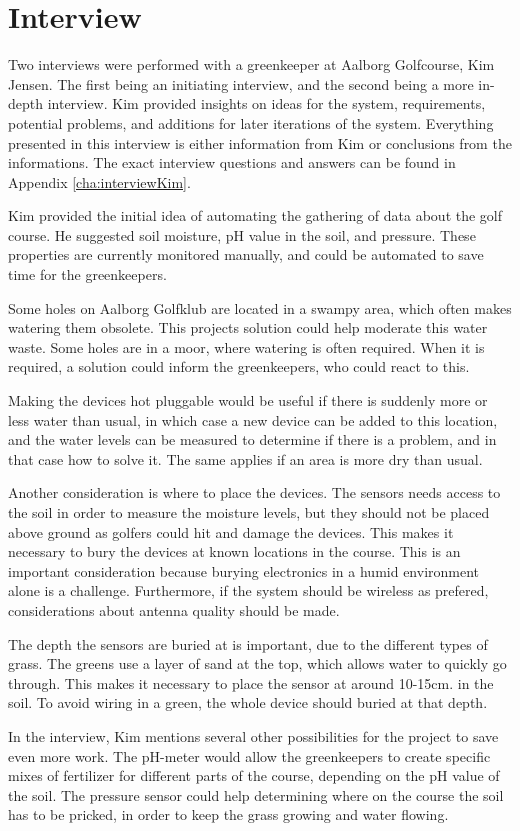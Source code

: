 \section{Interview}
Two interviews were performed with a greenkeeper at Aalborg Golfcourse, Kim Jensen. The first being an initiating interview, and the second being a more in-depth interview. Kim provided insights on ideas for the system, requirements, potential problems, and additions for later iterations of the system. Everything presented in this interview is either information from Kim or conclusions from the informations. The exact interview questions and answers can be found in Appendix \ref{cha:interviewKim}. 

Kim provided the initial idea of automating the gathering of data about the golf course. He suggested soil moisture, pH value in the soil, and pressure. These properties are currently monitored manually, and could be automated to save time for the greenkeepers.

Some holes on Aalborg Golfklub are located in a swampy area, which often makes watering them obsolete. This projects solution could help moderate this water waste. Some holes are in a moor, where watering is often required. When it is required, a solution could inform the greenkeepers, who could react to this.

Making the devices hot pluggable would be useful if there is suddenly more or less water than usual, in which case a new device can be added to this location, and the water levels can be measured to determine if there is a problem, and in that case how to solve it. The same applies if an area is more dry than usual.

Another consideration is where to place the devices. The sensors needs access to the soil in order to measure the moisture levels, but they should not be placed above ground as golfers could hit and damage the devices. This makes it necessary to bury the devices at known locations in the course. This is an important consideration because burying electronics in a humid environment alone is a challenge. Furthermore, if the system should be wireless as prefered, considerations about antenna quality should be made.

The depth the sensors are buried at is important, due to the different types of grass. The greens use a layer of sand at the top, which allows water to quickly go through. This makes it necessary to place the sensor at around 10-15cm. in the soil. To avoid wiring in a green, the whole device should buried at that depth.

In the interview, Kim mentions several other possibilities for the project to save even more work. The pH-meter would allow the greenkeepers to create specific mixes of fertilizer for different parts of the course, depending on the pH value of the soil. The pressure sensor could help determining where on the course the soil has to be pricked, in order to keep the grass growing and water flowing.